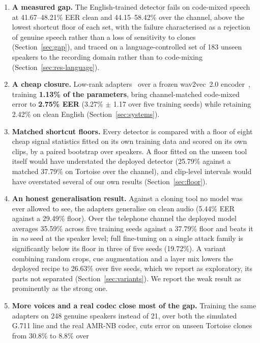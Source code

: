 \begin{enumerate}
  \item \textbf{A measured gap.} The English-trained detector fails on code-mixed
    speech at 41.67--48.21\% EER clean and 44.15--58.42\% over the channel, above
    the lowest shortcut floor of each set, with the failure characterised as a
    rejection of genuine speech rather than a loss of sensitivity to clones
    (Section~\ref{sec:gap}), and traced on a language-controlled set of 183 unseen
    speakers to the recording domain rather than to code-mixing
    (Section~\ref{sec:res-language}).
  \item \textbf{A cheap closure.} Low-rank adapters~\cite{hu2022lora} over a frozen
    wav2vec~2.0 encoder~\cite{baevski2020wav2vec}, training \textbf{1.13\% of the
    parameters}, bring channel-matched code-mixed error to \textbf{2.75\% EER}
    (3.27\% $\pm$ 1.17 over five training seeds) while retaining 2.42\% on clean
    English (Section~\ref{sec:systems}).
  \item \textbf{Matched shortcut floors.} Every detector is compared with a floor of
    eight cheap signal statistics fitted on its own training data and scored on its
    own clips, by a paired bootstrap over speakers. A floor fitted on the unseen tool
    itself would have understated the deployed detector (25.79\% against a matched
    37.79\% on Tortoise over the channel), and clip-level intervals would have
    overstated several of our own results (Section~\ref{sec:floor}).
  \item \textbf{An honest generalisation result.} Against a cloning tool no model was
    ever allowed to see, the adapters generalise on clean audio (5.44\% EER against a
    29.49\% floor). Over the telephone channel the deployed model averages 35.59\%
    across five training seeds against a 37.79\% floor and beats it in \emph{no} seed
    at the speaker level; full fine-tuning on a single attack family is significantly
    below its floor in three of five seeds (19.72\%). A variant combining random crops,
    cue augmentation and a layer mix lowers the deployed recipe to 26.63\% over five
    seeds, which we report as exploratory, its parts not separated
    (Section~\ref{sec:variants}). We report the weak result as
    prominently as the strong one.
  \item \textbf{More voices and a real codec close most of the gap.} Training the same
    adapters on 248 genuine speakers instead of 21, over both the simulated G.711 line and
    the real AMR-NB codec, cuts error on unseen Tortoise clones from 30.8\% to 8.8\% over

\end{enumerate}
